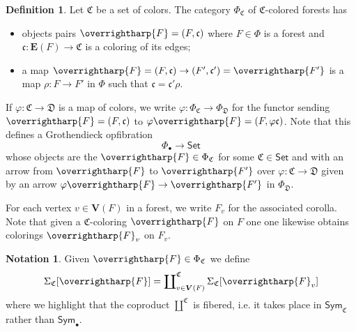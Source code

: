 \documentclass[a4paper,10pt
,draft
]{article}%
\numberwithin{equation}{section}
\numberwithin{figure}{section}
\theoremstyle{definition} %
\newtheorem{definition}[equation]{Definition}%
\newtheorem{notation}[equation]{Notation}%
\newcommand{\vect}[1]{\text{\overrightharp{\ensuremath{#1}}}}
\newcommand{\1}{\ensuremath{\mathbbm 1}}%
\begin{document}
\begin{definition}
Let $\mathfrak{C}$ be a set of colors.
The category $\Phi_{\mathfrak{C}}$ of $\mathfrak{C}$-colored forests has
\begin{itemize}
\item objects pairs
$\vect{F} = (F,\mathfrak{c})$
where 
$F\in \Phi$ is a forest
and 
$\mathfrak{c}\colon \boldsymbol{E}(F) \to \mathfrak{C}$ 
is a coloring of its edges;
\item a map
$\vect{F}=(F,\mathfrak{c}) \to 
(F',\mathfrak{c}') = \vect{F'}$
is a map $\rho \colon F \to F'$ in $\Phi$
such that
$\mathfrak{c} = \mathfrak{c}' \rho$.
\end{itemize}
If $\varphi\colon \mathfrak{C} \to \mathfrak{D}$ is a map of colors,
we write
$\varphi \colon \Phi_{\mathfrak{C}} \to \Phi_{\mathfrak{D}}$
for the functor sending 
$\vect{F} = (F,\mathfrak{c})$
to 
$\varphi\vect{F} = (F,\varphi\mathfrak{c})$.
Note that this defines a Grothendieck opfibration
\begin{equation}\label{PHIBGRO EQ}
\Phi_{\bullet} \to \mathsf{Set}
\end{equation}
whose objects are the $\vect{F} \in \Phi_{\mathfrak{C}}$ for some
$\mathfrak{C} \in \mathsf{Set}$
and with an arrow
from $\vect{F}$ to $\vect{F'}$
over
$\varphi \colon \mathfrak{C} \to \mathfrak{D}$
given by an arrow
$\varphi \vect{F} \to \vect{F'}$ in $\Phi_{\mathfrak{D}}$.
\end{definition}


For each vertex $v \in \boldsymbol{V}(F)$
in a forest, 
we write $F_v$ for the associated corolla.
Note that given a $\mathfrak{C}$-coloring $\vect{F}$ on $F$
one one likewise obtains colorings
$\vect{F}_v$ on $F_v$.



\begin{notation}
Given $\vect{F} \in \Phi_{\mathfrak{C}}$
we define
\begin{equation}\label{GENSIGC EQ}
\Sigma_{\mathfrak{C}}[\vect{F}]=
\coprod\nolimits^{\mathfrak{C}}_{v \in \boldsymbol{V}(F)} 
\Sigma_{\mathfrak{C}}[\vect{F}_v]
\end{equation}
where we highlight that the coproduct $\amalg^{\mathfrak{C}}$ is fibered, i.e. it takes place in $\mathsf{Sym}_{\mathfrak{C}}$
rather than $\mathsf{Sym}_{\bullet}$.
\end{notation}
\end{document}
